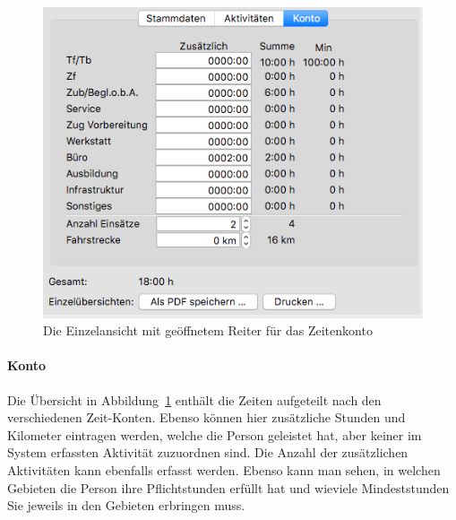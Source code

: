 \begin{figure}[!h]
	\centering
	\includegraphics[width=.75\textwidth]{img/einzelansicht_konto}
	\caption{Die Einzelansicht mit geöffnetem Reiter für das Zeitenkonto}
	\label{fig:personal:einzel:konto}
\end{figure}
\paragraph{Konto}
Die Übersicht in Abbildung~\ref{fig:personal:einzel:konto} enthält die Zeiten aufgeteilt nach den verschiedenen Zeit-Konten.
Ebenso können hier zusätzliche Stunden und Kilometer eintragen werden,
welche die Person geleistet hat, aber keiner im System erfassten Aktivität zuzuordnen sind.
Die Anzahl der zusätzlichen Aktivitäten kann ebenfalls erfasst werden.
Ebenso kann man sehen, in welchen Gebieten die Person ihre Pflichtstunden erfüllt hat und wieviele Mindeststunden Sie jeweils in den Gebieten erbringen muss.


